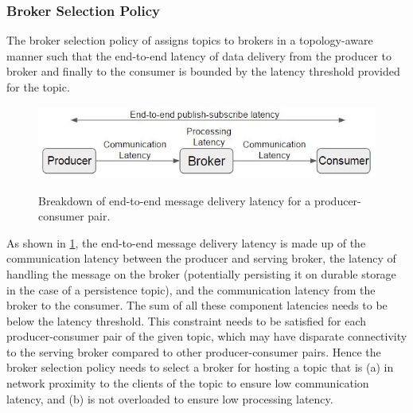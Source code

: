 \subsubsection{Broker Selection Policy}
The broker selection policy of \epulsar{} assigns topics to brokers in a topology-aware manner such that the end-to-end latency of data delivery from the producer to broker and finally to the consumer is bounded by the latency threshold provided for the topic. 
\begin{figure}[h]
\centering
\includegraphics[width=0.75\columnwidth]{figures/epulsar/e2e_latency_breakdown.JPG}
\label{fig:e2e_latency_breakdown}
\caption{Breakdown of end-to-end message delivery latency for a producer-consumer pair.}
\end{figure}
As shown in \cref{fig:e2e_latency_breakdown}, the end-to-end message delivery latency is made up of the communication latency between the producer and serving broker, the latency of handling the message on the broker (potentially persisting it on durable storage in the case of a persistence topic), and the communication latency from the broker to the consumer. The sum of all these component latencies needs to be below the latency threshold. This constraint needs to be satisfied for each producer-consumer pair of the given topic, which may have disparate connectivity to the serving broker compared to other producer-consumer pairs. Hence the broker selection policy needs to select a broker for hosting a topic that is (a) in network proximity to the clients of the topic to ensure low communication latency, and (b) is not overloaded to ensure low processing latency.

